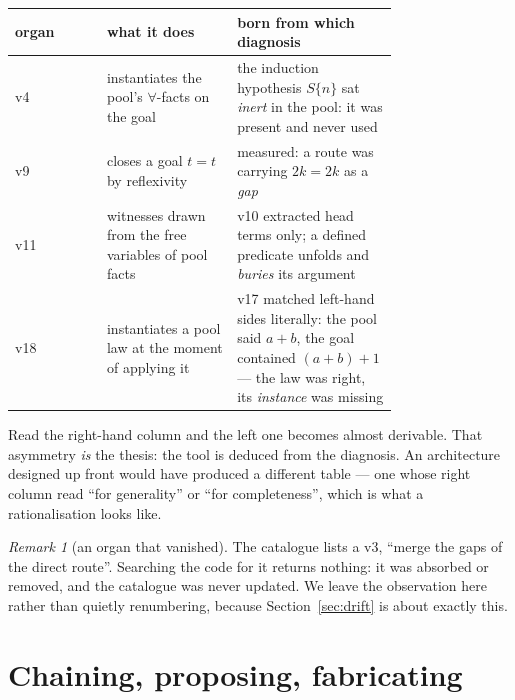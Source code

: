 \documentclass[11pt]{article}
\theoremstyle{remark}\newtheorem{remark}{Remark}
\begin{document}
\begin{center}\small
\begin{tabular}{@{}lL{0.34\linewidth}L{0.42\linewidth}@{}}
\toprule
organ & what it does & \textbf{born from which diagnosis} \\
\midrule
v4 & instantiates the pool's $\forall$-facts on the goal
   & the induction hypothesis $S\{n\}$ sat \emph{inert} in the pool: it was present and
     never used \\
v9 & closes a goal $t = t$ by reflexivity
   & measured: a route was carrying $2k = 2k$ as a \emph{gap} \\
v11 & witnesses drawn from the free variables of pool facts
   & v10 extracted head terms only; a defined predicate unfolds and \emph{buries} its
     argument \\
v18 & instantiates a pool law at the moment of applying it
   & v17 matched left-hand sides literally: the pool said $a+b$, the goal contained
     $(a+b)+1$ --- the law was right, its \emph{instance} was missing \\
\bottomrule
\end{tabular}
\end{center}

Read the right-hand column and the left one becomes almost derivable. That asymmetry
\emph{is} the thesis: the tool is deduced from the diagnosis. An architecture designed up
front would have produced a different table --- one whose right column read ``for
generality'' or ``for completeness'', which is what a rationalisation looks like.

\begin{remark}[an organ that vanished]
The catalogue lists a v3, ``merge the gaps of the direct route''. Searching the code for
it returns nothing: it was absorbed or removed, and the catalogue was never updated. We
leave the observation here rather than quietly renumbering, because
Section~\ref{sec:drift} is about exactly this.
\end{remark}

\section{Chaining, proposing, fabricating}
\label{sec:frontier}
\end{document}
